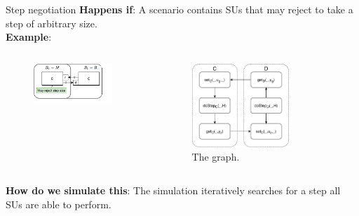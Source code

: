 \documentclass{beamer}
\begin{document}
\begin{frame}{Step negotiation}
    \textbf{Happens if}: A scenario contains SUs that may reject to take a step of arbitrary size.\\
    \textbf{Example}: 
    \begin{columns}[T] %
        \begin{column}{.48\textwidth}
            \begin{figure}    
                \includegraphics[width=0.9\textwidth]{images/step_scenario.pdf}
            \end{figure}
    \end{column}%
    \hfill%
    \begin{column}{.48\textwidth}
        \begin{figure}    
            \includegraphics[width=0.7\textwidth]{images/step_scenario_original.pdf}
            \caption{The graph.}
        \end{figure}
    \end{column}%
    \end{columns}
    \textbf{How do we simulate this}: The simulation iteratively searches for a step all SUs are able to perform.
\end{frame}
\end{document}
